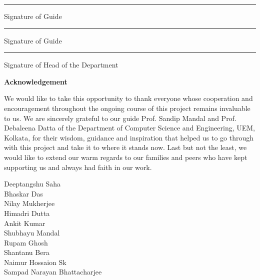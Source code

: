 \documentclass[14.49pt, a4paper, one side, margin = 2in]{article}
\begin{document}
\vspace{5cm}
\begin{flushleft}
   \rule{4cm}{0.15mm}
   \par Signature of Guide
   
   \begin{flushright}
   \vspace{-1.2cm}
   \rule{4cm}{0.15mm}
   \par Signature of Guide
   \end{flushright}
   \vspace{3cm}
   \rule{4cm}{0.15mm}
   \par Signature of Head of the Department
\end{flushleft}
\clearpage
\begin{center}
    \textbf{Acknowledgement}
    \vspace{3cm}
    \par We would like to take this opportunity to thank everyone whose cooperation and encouragement throughout the ongoing course of this project remains invaluable to us.
We are sincerely grateful to our guide Prof. Sandip Mandal and Prof. Debaleena Datta  of the Department of Computer Science and Engineering, UEM, Kolkata, for their wisdom, guidance and inspiration that helped us to go through with this project and take it to where it stands now.
Last but not the least, we would like to extend our warm regards to our families and peers who have kept supporting us and always had faith in our work.
\end{center}
\vspace{3cm}
\begin{flushright}
Deeptangshu Saha\\
 
Bhaskar Das\\
 
Nilay Mukherjee\\
 
Himadri Dutta\\
 
Ankit Kumar\\
 
Shubhayu Mandal\\
 
Rupam Ghosh\\
 
Shantanu Bera\\
 
Naimur Hossaion Sk\\
 
Sampad Narayan Bhattacharjee\\
\end{flushright}
\clearpage
\tableofcontents
\clearpage
\pagestyle{fancy}
\fancyhf{}
\end{document}
